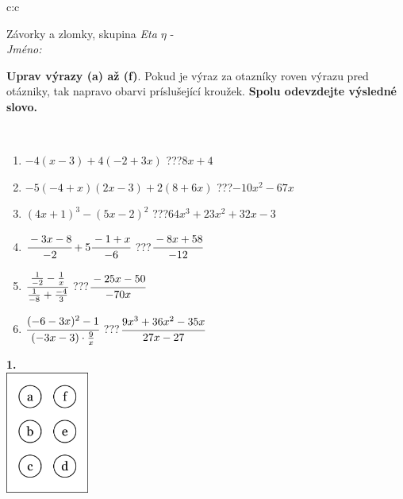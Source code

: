 \documentclass[10pt]{report}
\begin{document}
\begin{tabular}{c:c}
\begin{minipage}[c][104.5mm][t]{0.5\linewidth}
\begin{center}
\vspace{7mm}
{\huge Závorky a zlomky, skupina \textit{Eta $\eta$} -}\\[5mm]
\textit{Jméno:}\phantom{xxxxxxxxxxxxxxxxxxxxxxxxxxxxxxxxxxxxxxxxxxxxxxxxxxxxxxxxxxxxxxxxx}\\[5mm]
\begin{minipage}{0.95\linewidth}
\begin{center}
\textbf{Uprav výrazy (a) až (f)}. Pokud je výraz za otazníky roven výrazu pred otázniky, tak napravo obarvi príslušející kroužek. \textbf{Spolu odevzdejte výsledné slovo.}
\end{center}
\end{minipage}
\\[1mm]
\begin{minipage}{0.79\linewidth}
\begin{center}
\begin{varwidth}{\linewidth}
\begin{enumerate}
\normalsize
\item $-4(x-3)+4(-2+3x)$\quad \dotfill\; ???\;\dotfill \quad $8x+4$
\item $-5(-4+x)(2x-3)+2(8+6x)$\quad \dotfill\; ???\;\dotfill \quad $-10x^2-67x$
\item $(4x+1)^3-(5x-2)^2$\quad \dotfill\; ???\;\dotfill \quad $64x^3+23x^2+32x-3$
\item $\cfrac{-3x-8}{-2}+5\cfrac{-1+x}{-6}$\quad \dotfill\; ???\;\dotfill \quad $\cfrac{-8x+58}{-12}$
\item $\cfrac{\frac{1}{-2}-\frac{1}{x}}{\frac{1}{-8}+\frac{-4}{3}}$\quad \dotfill\; ???\;\dotfill \quad $\cfrac{-25x-50}{-70x}$
\item $\cfrac{(-6-3x)^2-1}{(-3x-3)\cdot\frac{9}{x}}$\quad \dotfill\; ???\;\dotfill \quad $\cfrac{9x^3+36x^2-35x}{27x-27}$
\end{enumerate}
\end{varwidth}
\end{center}
\end{minipage}
\begin{minipage}{0.20\linewidth}
\begin{center}
{\Huge\bfseries 1.} \\[2mm]
\includegraphics[height=40mm]{../images/braille.png}

\end{center}
\end{minipage}
\end{center}
\end{minipage}
\end{tabular}
\end{document}
